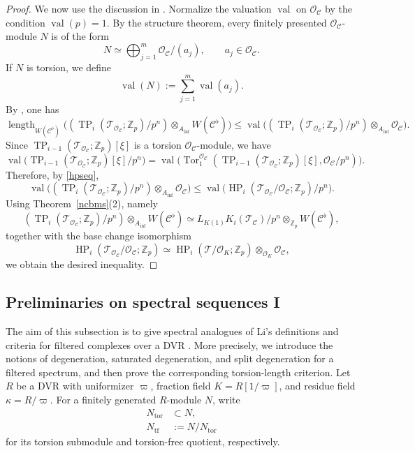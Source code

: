 \documentclass[11pt]{amsart}
\numberwithin{equation}{section}
\newcommand{\Z}{\mathbb{Z}}
\newcommand{\sC}{\mathcal{C}}
\newcommand{\sO}{\mathcal{O}}
\newcommand{\sT}{\mathcal{T}}
\newcommand{\val}{\operatorname{val}}
\newcommand{\tf}{\operatorname{tf}}
\newcommand{\len}{\operatorname{length}}
\newcommand{\tors}{\operatorname{tor}}
\newcommand{\Tor}{\operatorname{Tor}}
\numberwithin{equation}{section}
\newcommand{\Ainf}{A_{\operatorname{inf}}}
\newcommand{\TP}{\operatorname{TP}}
\newcommand{\HP}{\operatorname{HP}}
\newcommand{\LK}{{L_{K(1)}}}
\begin{document}
\begin{proof}
We now use the discussion in \cite[\S 7.10]{CK19}. Normalize the valuation $\val$ on $\sO_\sC$ by the condition $\val(p)=1$. By the structure theorem, every finitely presented $\sO_\sC$-module $N$ is of the form
\[
N \simeq \bigoplus_{j=1}^m \sO_\sC/(a_j),
\qquad a_j\in \sO_\sC.
\]
If $N$ is torsion, we define
\[
\val(N):=\sum_{j=1}^m \val(a_j).
\]
By \cite[Lemma 7.11]{CK19}, one has
\[
\len_{W(\sC^\flat)}\bigl((\TP_i(\sT_{\sO_\sC};\Z_p)/p^n)\otimes_{\Ainf} W(\sC^\flat)\bigr)
\leq
\val\bigl((\TP_i(\sT_{\sO_\sC};\Z_p)/p^n)\otimes_{\Ainf}\sO_\sC\bigr).
\]
Since $\TP_{i-1}(\sT_{\sO_\sC};\Z_p)[\xi]$ is a torsion $\sO_\sC$-module, we have
\[
\val\bigl(\TP_{i-1}(\sT_{\sO_\sC};\Z_p)[\xi]/p^n\bigr)
=
\val\bigl(\Tor_1^{\sO_\sC}(\TP_{i-1}(\sT_{\sO_\sC};\Z_p)[\xi],\sO_\sC/p^n)\bigr).
\]
Therefore, by \eqref{hpseq},
\[
\val\bigl((\TP_i(\sT_{\sO_\sC};\Z_p)/p^n)\otimes_{\Ainf}\sO_\sC\bigr)
\leq
\val\bigl(\HP_i(\sT_{\sO_\sC}/\sO_\sC;\Z_p)/p^n\bigr).
\]
Using Theorem~\ref{ncbms}(2), namely
\[
(\TP_i(\sT_{\sO_\sC};\Z_p)/p^n)\otimes_{\Ainf} W(\sC^\flat)
\simeq
\LK K_i(\sT_\sC)/p^n \otimes_{\Z_p} W(\sC^\flat),
\]
together with the base change isomorphism
\[
\HP_i(\sT_{\sO_\sC}/\sO_\sC;\Z_p)
\simeq
\HP_i(\sT/\sO_K;\Z_p)\otimes_{\sO_K}\sO_\sC,
\]
we obtain the desired inequality.
\end{proof}
\subsection{Preliminaries on spectral sequences I}
The aim of this subsection is to give spectral analogues of Li's definitions and
criteria for filtered complexes over a DVR \cite[Section~2]{L22}. More precisely, we introduce the
notions of degeneration, saturated degeneration, and split degeneration for a
filtered spectrum, and then prove the corresponding torsion-length criterion. Let $R$ be a DVR with uniformizer $\varpi$, fraction field
$K=R[1/\varpi]$, and residue field $\kappa=R/\varpi$.
For a finitely generated $R$-module $N$, write
\begin{align*}
  N_{\tors} &\subset N, \\
  N_{\tf} &:= N/N_{\tors}
\end{align*}
for its torsion submodule and torsion-free quotient, respectively.
\end{document}
